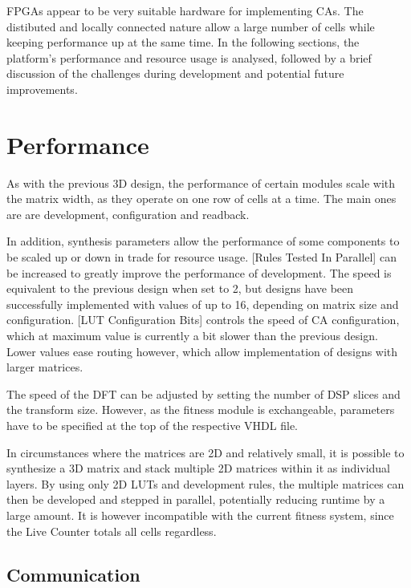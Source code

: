 FPGAs appear to be very suitable hardware for implementing CAs.
The distibuted and locally connected nature allow a large number of cells while keeping performance up at the same time.
In the following sections, the platform's performance and resource usage is analysed, followed by a brief discussion of the challenges during development and potential future improvements.


\section{Performance}

As with the previous 3D design, the performance of certain modules scale with the matrix width, as they operate on one row of cells at a time.
The main ones are are development, configuration and readback.

In addition, synthesis parameters allow the performance of some components to be scaled up or down in trade for resource usage.
[Rules Tested In Parallel] can be increased to greatly improve the performance of development.
The speed is equivalent to the previous design when set to 2, but designs have been successfully implemented with values of up to 16, depending on matrix size and configuration.
[LUT Configuration Bits] controls the speed of CA configuration, which at maximum value is currently a bit slower than the previous design.
Lower values ease routing however, which allow implementation of designs with larger matrices.

The speed of the DFT can be adjusted by setting the number of DSP slices and the transform size.
However, as the fitness module is exchangeable, parameters have to be specified at the top of the respective VHDL file.

In circumstances where the matrices are 2D and relatively small, it is possible to synthesize a 3D matrix and stack multiple 2D matrices within it as individual layers.
By using only 2D LUTs and development rules, the multiple matrices can then be developed and stepped in parallel, potentially reducing runtime by a large amount.
It is however incompatible with the current fitness system, since the Live Counter totals all cells regardless.

\subsection{Communication}

